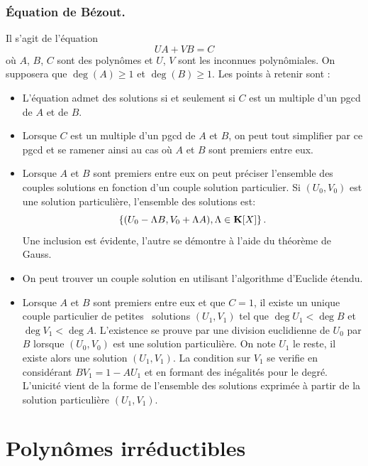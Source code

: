\subsubsection{\'Equation de Bézout.}
Il s'agit de l'équation
\begin{displaymath}
 UA + VB = C
\end{displaymath}
où $A$, $B$, $C$ sont des polynômes et $U$, $V$ sont les inconnues polynômiales. On supposera que $\deg(A)\geq 1$ et $\deg(B)\geq 1$. Les points à retenir sont :
\begin{itemize}
 \item L'équation admet des solutions si et seulement si $C$ est un multiple d'un pgcd de $A$ et de $B$.
 \item Lorsque $C$ est un multiple d'un pgcd de $A$ et $B$, on peut tout simplifier par ce pgcd et se ramener ainsi au cas où $A$ et $B$ sont premiers entre eux.
 \item Lorsque $A$ et $B$ sont premiers entre eux on peut préciser l'ensemble des couples solutions en fonction d'un couple solution particulier. Si $(U_0,V_0)$ est une solution particulière, l'ensemble des solutions est:
\begin{displaymath}
 \left\lbrace (U_0-\Lambda B, V_0+\Lambda A),\Lambda \in \mathbf{K}[X] \right\rbrace. 
\end{displaymath}
Une inclusion est évidente, l'autre se démontre à l'aide du théorème de Gauss.
\item On peut trouver un couple solution en utilisant l'algorithme d'Euclide étendu.
\item Lorsque $A$ et $B$ sont premiers entre eux et que $C=1$, il existe un unique couple particulier de \og petites\fg~ solutions $(U_1,V_1)$ tel que $\deg U_1 < \deg B$ et $\deg V_1 < \deg A$.\newline
L'existence se prouve par une division euclidienne de $U_0$ par $B$ lorsque $(U_0,V_0)$ est une solution particulière. On note $U_1$ le reste, il existe alors une solution $(U_1,V_1)$. La condition sur $V_1$ se verifie en considérant $BV_1 = 1- AU_1$ et en formant des inégalités pour le degré. L'unicité vient de la forme de l'ensemble des solutions exprimée à partir de la solution particulière $(U_1, V_1)$.
\end{itemize}


\section{Polynômes irréductibles}
